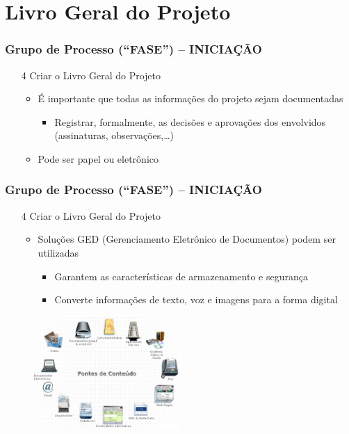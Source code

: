 \section{Livro Geral do Projeto}
\begin{frame}
   \frametitle{Grupo de Processo (“FASE”) – INICIAÇÃO}
   \begin{itemize}
    \item[4] Criar o Livro Geral do Projeto
    \begin{itemize}
     \item É importante que todas as informações do projeto sejam documentadas
     \begin{itemize}
      \item Registrar, formalmente, as decisões e aprovações dos envolvidos (assinaturas, observações,…)
     \end{itemize}
    \item Pode ser papel ou eletrônico
     \end{itemize}
   \end{itemize}
\end{frame}

\begin{frame}
   \frametitle{Grupo de Processo (“FASE”) – INICIAÇÃO}
   \begin{itemize}
    \item[4] Criar o Livro Geral do Projeto
    \begin{itemize}
     \item Soluções GED (Gerenciamento Eletrônico de Documentos)  podem ser utilizadas
     \begin{itemize}
      \item Garantem as características de armazenamento e segurança
      \item Converte informações de texto, voz e imagens para a forma digital
     \end{itemize}
     \end{itemize}
   \end{itemize}
   \begin{figure}
    \centering
    \includegraphics[width = 0.5\textwidth]{figs/fig1_11.png}
   \end{figure}
\end{frame}

